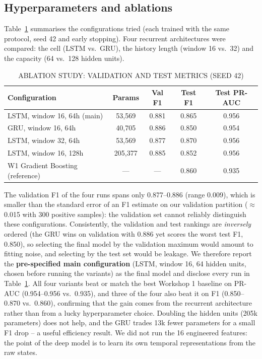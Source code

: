 \documentclass[conference]{IEEEtran}
\begin{document}
\subsection{Hyperparameters and ablations}
Table~\ref{tab:ablation} summarises the configurations tried (each trained
with the same protocol, seed 42 and early stopping). Four recurrent
architectures were compared: the cell (LSTM vs.\ GRU), the history length
(window 16 vs.\ 32) and the capacity (64 vs.\ 128 hidden units).

\begin{table}[t]
\caption{ABLATION STUDY: VALIDATION AND TEST METRICS (SEED 42)}
\label{tab:ablation}
\centering
\begin{tabular}{|l|c|c|c|c|}
\hline
\textbf{Configuration} & \textbf{Params} & \textbf{Val F1} & \textbf{Test F1} & \textbf{Test PR-AUC} \\ \hline
LSTM, window 16, 64h (main) & 53{,}569 & 0.881 & 0.865 & 0.956 \\ \hline
GRU, window 16, 64h & 40{,}705 & 0.886 & 0.850 & 0.954 \\ \hline
LSTM, window 32, 64h & 53{,}569 & 0.877 & 0.870 & 0.956 \\ \hline
LSTM, window 16, 128h & 205{,}377 & 0.885 & 0.852 & 0.956 \\ \hline
W1 Gradient Boosting (reference) & --- & --- & 0.860 & 0.935 \\ \hline
\end{tabular}
\end{table}

The validation F1 of the four runs spans only 0.877--0.886 (range 0.009),
which is smaller than the standard error of an F1 estimate on our validation
partition ($\approx$0.015 with 300 positive samples): the validation set
cannot reliably distinguish these configurations. Consistently, the
validation and test rankings are \emph{inversely} ordered (the GRU wins on
validation with 0.886 yet scores the worst test F1, 0.850), so selecting the
final model by the validation maximum would amount to fitting noise, and
selecting by the test set would be leakage. We therefore report the
\textbf{pre-specified main configuration} (LSTM, window 16, 64 hidden units,
chosen before running the variants) as the final model and disclose every
run in Table~\ref{tab:ablation}. All four variants beat or match the best
Workshop 1 baseline on PR-AUC (0.954--0.956 vs.\ 0.935), and three of the
four also beat it on F1 (0.850--0.870 vs.\ 0.860), confirming that the gain
comes from the recurrent architecture rather than from a lucky
hyperparameter choice. Doubling the hidden units (205k parameters) does not
help, and the GRU trades 13k fewer parameters for a small F1 drop -- a useful
efficiency result. We did not run the 16 engineered features: the point of
the deep model is to learn its own temporal representations from the raw
states.
\end{document}
